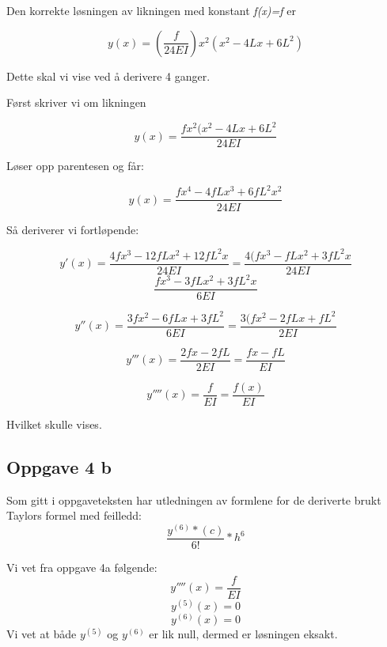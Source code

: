 Den korrekte løsningen av likningen med konstant \textit{f(x)=f} er

\begin{equation}
y(x)=(\frac{f}{24EI})x^2(x^2-4Lx+6L^2)
\end{equation}

Dette skal vi vise ved å derivere 4 ganger.

Først skriver vi om likningen

\begin{equation}
y(x)=\frac{fx^2(x^2-4Lx+6L^2}{24EI}
\end{equation}

Løser opp parentesen og får:

\begin{equation}
y(x)=\frac{fx^4-4fLx^3+6fL^2x^2}{24EI}
\end{equation}

Så deriverer vi fortløpende:

\begin{equation}
y'(x)=\frac{4fx^3-12fLx^2+12fL^2x}{24EI} = \frac{4(fx^3-fLx^2+3fL^2x}{24EI}
\end{equation}
\begin{equation}
\frac{fx^3-3fLx^2+3fL^2x}{6EI}
\end{equation}

\begin{equation}
y''(x) = \frac{3fx^2-6fLx+3fL^2}{6EI} = \frac{3(fx^2-2fLx+fL^2}{2EI}
\end{equation}

\begin{equation}
y'''(x) = \frac{2fx-2fL}{2EI} = \frac{fx-fL}{EI}
\end{equation}

\begin{equation}
y''''(x) = \frac{f}{EI} = \frac{f(x)}{EI}
\end{equation}

Hvilket skulle vises.

\subsection{Oppgave 4 b}\label{sec:oppg4}
Som gitt i oppgaveteksten har utledningen av formlene for de deriverte brukt Taylors formel med feilledd:
\begin{equation}
\frac{y^{(6)}*(c)}{6!} * h^6
\end{equation}

Vi vet fra oppgave 4a følgende:
\begin{equation}
y''''(x) = \frac{f}{EI}
\end{equation}
\begin{equation}
y^{(5)}(x) = 0
\end{equation}
\begin{equation}
y^{(6)}(x) = 0
\end{equation}
Vi vet at både $y^{(5)} $ og $y^{(6)} $ er lik null, dermed er løsningen eksakt.

